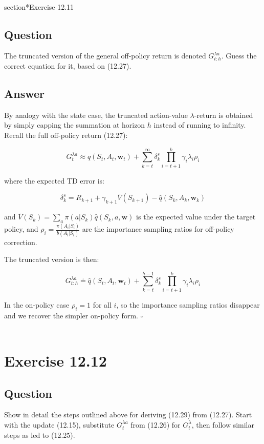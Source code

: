 \documentclass{article}
\begin{document}
\\section*{Exercise 12.11}

\subsection*{Question}

The truncated version of the general off-policy return is denoted $G_{t:h}^{\lambda a}$. 
Guess the correct equation for it, based on (12.27).

\subsection*{Answer}

By analogy with the state case, the truncated action-value $\lambda$-return is obtained 
by simply capping the summation at horizon $h$ instead of running to infinity. Recall 
the full off-policy return (12.27):

$$G_t^{\lambda a} \approx \hat{q}(S_t, A_t, \mathbf{w}_t) + \sum_{k=t}^{\infty} \delta_k^s 
\prod_{i=t+1}^{k} \gamma_i \lambda_i \rho_i$$

where the expected TD error is:

$$\delta_k^s = R_{k+1} + \gamma_{k+1}\bar{V}(S_{k+1}) - \hat{q}(S_k, A_k, \mathbf{w}_k)$$

and $\bar{V}(S_k) = \sum_a \pi(a|S_k)\hat{q}(S_k, a, \mathbf{w})$ is the expected value 
under the target policy, and $\rho_i = \frac{\pi(A_i|S_i)}{b(A_i|S_i)}$ are the 
importance sampling ratios for off-policy correction.

The truncated version is then:

$$G_{t:h}^{\lambda a} \doteq \hat{q}(S_t, A_t, \mathbf{w}_t) + \sum_{k=t}^{h-1} \delta_k^s 
\prod_{i=t+1}^{k} \gamma_i \lambda_i \rho_i$$

In the on-policy case $\rho_i = 1$ for all $i$, so the importance sampling ratios 
disappear and we recover the simpler on-policy form. \hfill$\square$
\\\\
\section*{Exercise 12.12}

\subsection*{Question}

Show in detail the steps outlined above for deriving (12.29) from (12.27). Start with 
the update (12.15), substitute $G_t^{\lambda a}$ from (12.26) for $G_t^{\lambda}$, then 
follow similar steps as led to (12.25).
\end{document}
